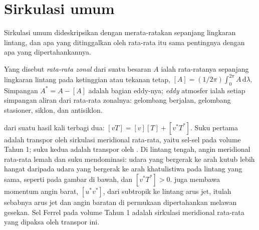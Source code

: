 \section{Sirkulasi umum}\label{sec:b3:atmospheric-dynamics:general-circulation}

Sirkulasi umum dideskripsikan dengan merata-ratakan sepanjang lingkaran lintang,
dan apa yang ditinggalkan oleh rata-rata itu sama pentingnya dengan apa yang dipertahankannya.

\begin{definition}\label{def:b3:atmospheric-dynamics:eddy}
Yang disebut \emph{rata-rata zonal} dari suatu besaran $A$ ialah rata-ratanya
sepanjang lingkaran lintang pada ketinggian atau tekanan tetap, $[A] =
(1/2\pi)\int_0^{2\pi} A\,\mathrm d\lambda$. Simpangan $A^* = A - [A]$
adalah bagian eddy-nya; \emph{eddy} atmosfer ialah setiap
simpangan aliran dari rata-rata zonalnya: gelombang
berjalan, gelombang stasioner, siklon, dan antisiklon.
\end{definition}

 dari suatu hasil kali terbagi dua: $[vT] = [v][T] + [v^*T^*]$. Suku
pertama adalah transpor oleh sirkulasi meridional rata-rata, yaitu sel-sel
pada volume Tahun 1; suku kedua adalah transpor oleh . Di
lintang tengah, angin meridional rata-rata lemah dan suku 
mendominasi: udara yang bergerak ke arah kutub lebih hangat daripada udara yang bergerak ke arah khatulistiwa pada
lintang yang sama, seperti pada gambar di bawah, dan $[v^*T^*] > 0$.  juga
membawa momentum angin barat, $[u^*v^*]$, dari subtropik ke lintang
arus jet, itulah sebabnya arus jet dan angin baratan di permukaan
dipertahankan melawan gesekan. Sel Ferrel pada volume Tahun 1 adalah
sirkulasi meridional rata-rata yang dipaksa oleh transpor  ini.

